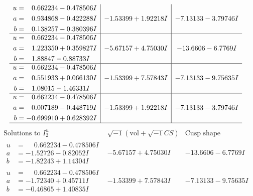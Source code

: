 \documentclass[1p]{elsarticle_modified}
\theoremstyle{definition}
\newcommand{\I}{\sqrt{-1}}
\begin{document}
$$\begin{array}{c|c|c}
\begin{aligned}
u &= \phantom{-}0.662234 - 0.478506 I \\
a &= \phantom{-}0.934868 - 0.422288 I \\
b &= \phantom{-}0.138257 - 0.380396 I\end{aligned}
 & -1.53399 + 1.92218 I & -7.13133 - 3.79746 I \\ \hline\begin{aligned}
u &= \phantom{-}0.662234 - 0.478506 I \\
a &= \phantom{-}1.223350 + 0.359827 I \\
b &= \phantom{-}1.88847 - 0.88733 I\end{aligned}
 & -5.67157 + 4.75030 I & -13.6606 - 6.7769 I \\ \hline\begin{aligned}
u &= \phantom{-}0.662234 - 0.478506 I \\
a &= \phantom{-}0.551933 + 0.066130 I \\
b &= \phantom{-}1.08015 - 1.46331 I\end{aligned}
 & -1.53399 + 7.57843 I & -7.13133 - 9.75635 I \\ \hline\begin{aligned}
u &= \phantom{-}0.662234 - 0.478506 I \\
a &= \phantom{-}0.007189 - 0.448719 I \\
b &= -0.699910 + 0.628392 I\end{aligned}
 & -1.53399 + 1.92218 I & -7.13133 - 3.79746 I\\
 \hline 
 \end{array}$$\newpage$$\begin{array}{c|c|c}  
\text{Solutions to }I^u_{2}& \I (\text{vol} + \sqrt{-1}CS) & \text{Cusp shape}\\
 \hline 
\begin{aligned}
u &= \phantom{-}0.662234 - 0.478506 I \\
a &= -1.52726 - 0.82052 I \\
b &= -1.82243 + 1.14304 I\end{aligned}
 & -5.67157 + 4.75030 I & -13.6606 - 6.7769 I \\ \hline\begin{aligned}
u &= \phantom{-}0.662234 - 0.478506 I \\
a &= -1.72340 + 0.45711 I \\
b &= -0.46865 + 1.40835 I\end{aligned}
 & -1.53399 + 7.57843 I & -7.13133 - 9.75635 I \\ \hline\begin{aligned}

\end{aligned}
\end{array}$$
\end{document}
